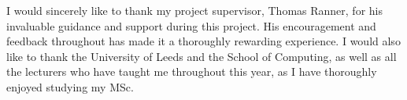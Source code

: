I would sincerely like to thank my project supervisor, Thomas Ranner, for his invaluable guidance and support during this project. His encouragement and feedback throughout has made it a thoroughly rewarding experience. I would also like to thank the University of Leeds and the School of Computing, as well as all the lecturers who have taught me throughout this year, as I have thoroughly enjoyed studying my MSc.

